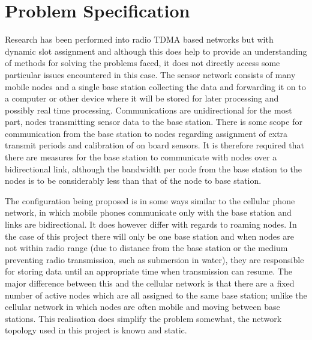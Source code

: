 \documentclass[parskip]{cs4rep}
\begin{document}
\section{Problem Specification}

Research has been performed into radio TDMA based networks but with dynamic slot assignment \cite{PR3} and although this does help to provide an understanding of methods for solving the problems faced, it does not directly access some particular issues encountered in this case. The sensor network consists of many mobile nodes and a single base station collecting the data and forwarding it on to a computer or other device where it will be stored for later processing and possibly real time processing. Communications are unidirectional for the most part, nodes transmitting sensor data to the base station. There is some scope for communication from the base station to nodes regarding assignment of extra transmit periods and calibration of on board sensors. It is therefore required that there are measures for the base station to communicate with nodes over a bidirectional link, although the bandwidth per node from the base station to the nodes is to be considerably less than that of the node to base station.

The configuration being proposed is in some ways similar to the cellular phone network, in which mobile phones communicate only with the base station and links are bidirectional. It does however differ with regards to roaming nodes. In the case of this project there will only be one base station and when nodes are not within radio range (due to distance from the base station or the medium preventing radio transmission, such as submersion in water), they are responsible for storing data until an appropriate time when transmission can resume. The major difference between this and the cellular network is that there are a fixed number of active nodes which are all assigned to the same base station; unlike the cellular network in which nodes are often mobile and moving between base stations. This realisation does simplify the problem somewhat, the network topology used in this project is known and static.
\end{document}
